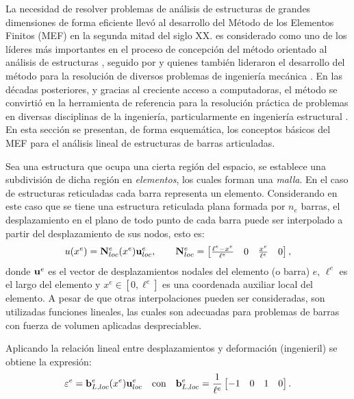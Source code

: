 %
La necesidad de resolver problemas de análisis de estructuras de grandes dimensiones de forma eficiente llevó al desarrollo del Método de los Elementos Finitos (MEF) en la segunda mitad del siglo XX. %
%
\citeauthor{Zienkiewicz1972} es considerado como uno de los líderes más importantes en el proceso de concepción del método orientado al análisis de estructuras \citep{Zienkiewicz1972}, seguido por \citeauthor{Bathe1982} y \citeauthor{Hughes1987a} quienes también lideraron el desarrollo del método para la resolución de diversos problemas de ingeniería mecánica \citep{Bathe1982,Hughes1987a}. %
%
En las décadas posteriores, y gracias al creciente acceso a computadoras, el método se convirtió en la herramienta de referencia para la resolución práctica de problemas en diversas disciplinas de la ingeniería, particularmente en ingeniería estructural \citep{Onate2013,Zienkiewicz2014}. %
%
En esta sección se presentan, de forma esquemática, los conceptos básicos del MEF para el análisis lineal de estructuras de barras articuladas.



Sea una estructura que ocupa una cierta región del espacio, se establece una subdivisión de dicha región en \textit{elementos}, los cuales forman una \textit{malla}. %
%
En el caso de estructuras reticuladas cada barra representa un elemento. %
%
Considerando en este caso que se tiene una estructura reticulada plana formada por $n_e$ barras, el desplazamiento en el plano de todo punto de cada barra puede ser interpolado a partir del desplazamiento de sus nodos, esto es:
%
\begin{equation}
u(x^e) = {\bf N}_{loc}^e(x^e) {\bf u}_{loc}^e,
\qquad
{\bf N}_{loc}^e = \left[ \begin{matrix}
\frac{\ell^e - x^e}{\ell^e} & 0 & \frac{x^e}{\ell^e} & 0
\end{matrix} \right],
\end{equation}
donde ${\bf u}^e$ es el vector de desplazamientos nodales del elemento (o barra) $e$, $\ell^e$ es el largo del elemento y $x^e\in[0,\ell^e]$ es una coordenada auxiliar local del elemento. %
%
A pesar de que otras interpolaciones pueden ser consideradas, son utilizadas funciones lineales, las cuales son adecuadas para problemas de barras con fuerza de volumen aplicadas despreciables.


Aplicando la relación lineal entre desplazamientos y deformación (ingenieril) se obtiene la expresión:
%
\begin{equation}\label{eqn:expeps}
\varepsilon^e =  {\bf b}_{L,loc}^e(x^e) {\bf u}_{loc}^e
\quad
\text{con}
\quad
{\bf b}_{L,loc}^e = \frac{1}{\ell^e} \left[ \begin{matrix}
-1 & 0 & 1 & 0
\end{matrix} \right].
\end{equation}

